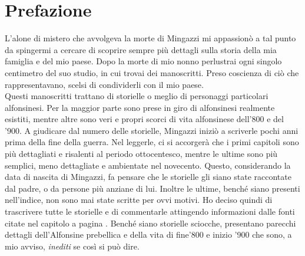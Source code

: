 \thispagestyle{empty}
\chapter*{Prefazione}
L'alone di mistero che avvolgeva la morte di Mingazzi mi appassionò a tal punto da spingermi a cercare di scoprire sempre più dettagli sulla storia della mia famiglia e del mio paese. Dopo la morte di mio nonno perlustrai ogni singolo centimetro del suo studio, in cui trovai dei manoscritti. Preso coscienza di ciò che rappresentavano, scelsi di condividerli con il mio paese.\\
\indent Questi manoscritti trattano di storielle o meglio di personaggi particolari alfonsinesi. Per la maggior parte sono prese in giro di alfonsinesi realmente esistiti, mentre altre sono veri e propri scorci di vita alfonsinese dell'800 e del '900. A giudicare dal numero delle storielle, Mingazzi iniziò a scriverle pochi anni prima della fine della guerra. Nel leggerle, ci si accorgerà che i primi capitoli sono più dettagliati e risalenti al periodo ottocentesco, mentre le ultime sono più semplici, meno dettagliate e ambientate nel novecento. Questo, considerando la data di nascita di Mingazzi, fa pensare che le storielle gli siano state raccontate dal padre, o da persone più anziane di lui. Inoltre le ultime, benché siano presenti nell'indice, non sono mai state scritte per ovvi motivi. Ho deciso quindi di trascrivere tutte le storielle e di commentarle attingendo informazioni dalle fonti citate nel capitolo \textit{ }a pagina \pageref{fonti}. Benché siano storielle sciocche, presentano parecchi dettagli dell'Alfonsine prebellica e della vita di fine'800 e inizio '900 che sono, a mio avviso, \emph{inediti} se così si può dire.\\

